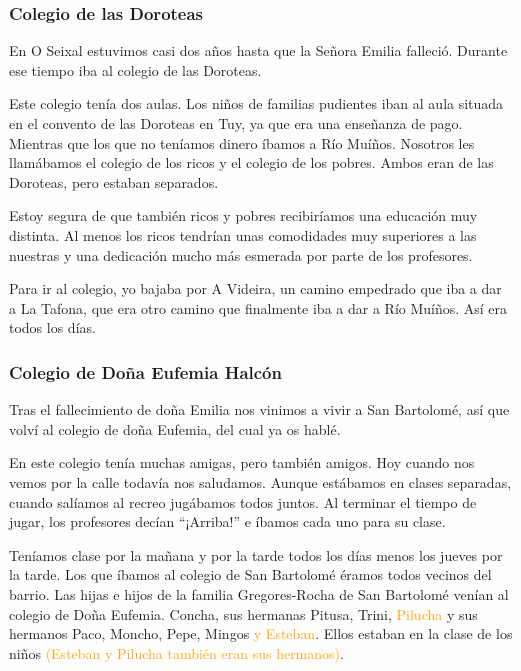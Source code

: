 \documentclass[12pt,a5paper]{book}
\begin{document}





\subsubsection*{Colegio de las Doroteas}

En O Seixal estuvimos casi dos años hasta que la Señora Emilia falleció. Durante ese tiempo iba al colegio de las Doroteas.

Este colegio tenía dos aulas. Los niños de familias pudientes iban al aula situada en el convento de las Doroteas en Tuy, ya que era una enseñanza de pago. Mientras que los que no teníamos dinero íbamos a Río Muíños. Nosotros les llamábamos el colegio de los ricos y el colegio de los pobres. Ambos eran de las Doroteas, pero estaban separados.

Estoy segura de que también ricos y pobres recibiríamos una educación muy distinta. Al menos los ricos tendrían unas comodidades muy superiores a las nuestras y una dedicación mucho más esmerada por parte de los profesores.

Para ir al colegio, yo bajaba por A Videira, un camino empedrado que iba a dar a La Tafona, que era otro camino que finalmente iba a dar a Río Muíños. Así era todos los días.


\subsubsection*{Colegio de Doña Eufemia Halcón}

Tras el fallecimiento de doña Emilia nos vinimos a vivir a San Bartolomé, así que volví al colegio de doña Eufemia, del cual ya os hablé.

En este colegio tenía muchas amigas, pero también amigos. Hoy cuando nos vemos por la calle todavía nos saludamos. Aunque estábamos en clases separadas, cuando salíamos al recreo jugábamos todos juntos. Al terminar el tiempo de jugar, los profesores decían ``¡Arriba!'' e íbamos cada uno para su clase. 

Teníamos clase por la mañana y por la tarde todos los días menos los jueves por la tarde. Los que íbamos al colegio de San Bartolomé éramos todos vecinos del barrio. Las hijas e hijos de la familia Gregores-Rocha de San Bartolomé venían al colegio de Doña Eufemia. Concha, sus hermanas Pitusa, Trini, \textcolor{orange}{Pilucha} y sus hermanos Paco, Moncho, Pepe, Mingos \textcolor{orange}{y Esteban}. Ellos estaban en la clase de los niños \textcolor{orange}{(Esteban y Pilucha también eran sus hermanos)}.
\end{document}
